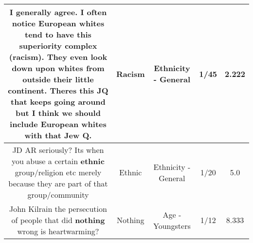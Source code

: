 \documentclass[11pt]{article}
\newlength\mylength
\begin{document}
\begin{center}
\begin{longtable}{|C{.65\mylength}|C{.30\mylength}|C{.12\mylength}|C{.12\mylength}|C{.12\mylength}|}
  \small I generally agree. I often notice European whites tend to have this superiority complex (\textbf{racism}). They even look down upon whites from outside their little continent. Theres this JQ that keeps going around but I think we should include European whites with that Jew Q.\normalsize   & Racism & Ethnicity - General & 1/45 & 2.222 \\  \hline
  \small JD AR seriously? Its when you abuse a certain \textbf{ethnic} group/religion etc merely because they are part of that group/community\normalsize   & Ethnic & Ethnicity - General & 1/20 & 5.0 \\  \hline
  \small John Kilrain the persecution of people that did \textbf{nothing} wrong is heartwarming?\normalsize   & Nothing & Age - Youngsters & 1/12 & 8.333 \\  \hline

\end{longtable}
\end{center}
\end{document}
